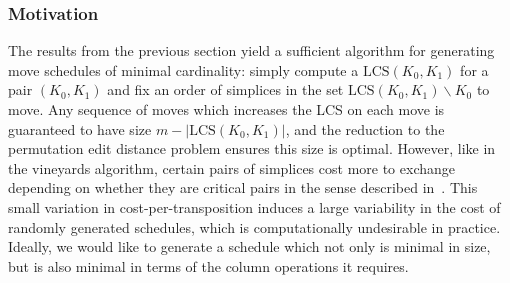 \documentclass{article} %
\DeclareMathOperator*{\argmin}{arg\,min}
\begin{document}
\subsubsection{Motivation}
The results from the previous section yield a sufficient algorithm for generating move schedules of minimal cardinality: simply compute a $\mathrm{LCS}(K_0, K_1)$ for a pair $(K_0, K_1)$ and fix an order of simplices in the set $\mathrm{LCS}(K_0, K_1) \smallsetminus K_0$ to move. Any sequence of moves which increases the LCS on each move is guaranteed to have size $m - \lvert \mathrm{LCS}(K_0, K_1) \rvert$, and the reduction to the permutation edit distance problem ensures this size is optimal. 
However, like in the vineyards algorithm, certain pairs of simplices cost more to exchange depending on whether they are critical pairs in the sense described in~\cite{cohen2006vines}. 
This small variation in cost-per-transposition induces a large variability in the cost of randomly generated schedules, which is computationally undesirable in practice. Ideally, we would like to generate a schedule which not only is minimal in size, but is also minimal in terms of the column operations it requires. 

\end{document}
